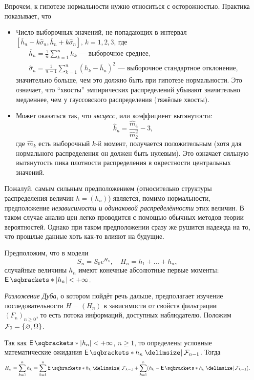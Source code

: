 Впрочем, к гипотезе нормальности нужно относиться с осторожностью. Практика 
показывает, что
\begin{itemize}
	\item Число выборочных значений, не попадающих в интервал 
	\([\overline{h}_{n} - k\hat{\sigma}_{n}, \overline{h}_{n} + 
	k\hat{\sigma}_{n}]\), \(k = 1, 2, 3\), где 
	\begin{gather*}
		\overline{h}_{n} = \frac{1}{n}\sum_{k = 1}^{n} h_{k} \text{~--- 
		выборочное среднее,} \\
		\hat{\sigma}_{n} = \frac{1}{n - 1}\sum_{k = 1}^{n} (h_{k} - 
		\overline{h}_{n})^{2}\text{~--- выборочное стандартное отклонение,} 
	\end{gather*}
	значительно больше, чем это должно быть при гипотезе нормальности. Это 
	означает, что ``хвосты'' эмпирических распределений убывают значительно 
	медленнее, чем у гауссовского распределения (тяжёлые хвосты).
	\item Может оказаться так, что \emph{эксцесс}, или коэффициент вытянутости:
	\[
		\hat{k}_{n} = \frac{\hat{m}_{4}}{\hat{m}_{2}^{2}} - 3,
	\]
	где \(\hat{m}_{k}\) есть выборочный \(k\)-й момент, получается 
	положительным (хотя для нормального распределения он должен быть нулевым). 
	Это означает сильную вытянутость пика плотности распределения в окрестности 
	центральных значений.
\end{itemize}

Пожалуй, самым сильным предположением (относительно структуры распределения 
величин \(h = (h_{n})\)) является, помимо нормальности, предположение 
\emph{независимости и одинаковой распределённости} этих величин. В таком случае 
анализ цен легко проводится с помощью обычных методов теории вероятностей. 
Однако при таком предположении сразу же рушится надежда на то, что прошлые 
данные хоть как-то влияют на будущие.

Предположим, что в модели
\[
	S_{n} = S_{0}e^{H_{n}}, \quad H_{n} = h_{1} + \ldots + h_{n},
\]
случайные величины \(h_{n}\) имеют конечные абсолютные первые моменты: 
\(\E{|h_{n}|} < +\infty\). 

\emph{Разложение Дуба}, о котором пойдёт речь дальше, предполагает изучение 
последовательности \(H = (H_{n})\) в зависимости от свойств фильтрации 
\((F_{n})_{n \geq 0}\), то есть потока информаций, доступных наблюдателю. 
Положим \(\mathcal{F}_{0} = \{\varnothing, \Omega\}\).

Так как \(\E{|h_{n}|} < +\infty\), \(n \geq 1\), то определены условные 
математические ожидания \(\E{h_{n} \given \F_{n - 1}}\). Тогда
\[
	H_{n} = \sum_{k = 1}^{n} h_{k} = \sum_{k = 1}^{n} \E{h_{k} \given \F_{k - 
	1}} + \sum_{k = 1}^{n} (h_{k} - \E{h_{k} \given \F_{k - 1}}).
\]

